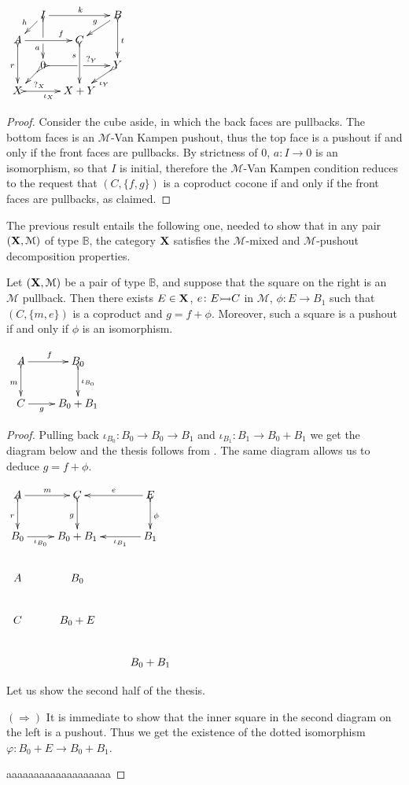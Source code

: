 \documentclass[a4paper,UKenglish,cleveref,pdftex, thm-restate,numberwithinsect,anonymous]{lipics}
\newcommand{\mto}[0]{\scalebox{1}{$\rightarrowtail$}}
\def\B{\textbf {\textup{B}}}
\def\C{\textbf {\textup{C}}}
\def\X{\textbf {\textup{X}}}
\begin{document}
\noindent 
\parbox{4cm}{$\xymatrix@C=10pt@R=10pt{&I\ar@{>->}[dd]|\hole_(.65){a}\ar[rr]^{k} \ar[dl]_{h} && B \ar@{>->}[dd]^{t} \ar[dl]_{g} \\ A  \ar@{>->}[dd]_{r}\ar[rr]^(.7){f} & & C \ar@{>->}[dd]_(.3){s}\\&0\ar@{>->}[rr]|\hole^(.65){?_Y} \ar@{>->}[dl]^{?_X} && Y \ar@{>->}[dl]^{\iota_Y} \\X \ar@{>->}[rr]_{\iota_X} & & X+Y}$}
 \parbox{10cm}{\begin{proof}
Consider the cube aside, in which the back faces are pullbacks. The bottom faces is an $\mathcal{M}$-Van Kampen pushout, thus the top face is a pushout if and only if the front faces are pullbacks. By strictness of $0$, $a\colon I\to 0$ is an isomorphism, so that $I$ is initial, therefore the $\mathcal{M}$-Van Kampen condition reduces to the request that $(C, \{f,g\})$ is a coproduct cocone if and only if the front faces are pullbacks, as claimed.
\end{proof}}

The previous result entails the following one, needed to show that  in any pair $(\X, \mathcal{M})$ of type $\mathbb{B}$, the category $\X$ satisfies the $\mathcal{M}$-mixed and $\mathcal{M}$-pushout decomposition properties.

\noindent
\parbox{10.7cm}{\begin{proposition}\label{prop:po2}
		Let $(\X, \mathcal{M})$ be a pair of type $\mathbb{B}$, and suppose that the square on the right is an $\mathcal{M}$ pullback. Then there exists $E\in \X$, $e\colon E\mto C$ in $\mathcal{M}$, $\phi:E\to B_1$ such that $(C, \{m, e\})$ is a coproduct and $g=f+\phi$. Moreover, such a square is a pushout if and only if $\phi$ is an isomorphism.
\end{proposition}} \parbox{3cm}{\vspace{-.2cm}$\xymatrix{A  \ar[r]^{f} \ar@{>->}[d]_{m}& B_0 \ar@{>->}[d]^{\iota_{B_{0}}}\\ C\ar[r]_-{g} & B_0+B_1}$}
\iffalse 
\begin{proof}
		Pulling back $\iota_{B_0}\colon B_0\to B_0\to B_1$ and $\iota_{B_1}\colon B_1\to B_0 + B_1$ we get the diagram below and the thesis follows from . The same diagram allows us to deduce $g=f+\phi$.	
	\parbox{5.2cm}{$\xymatrix{A\ar[r]^-{m} \ar@{>->}[d]_{r}& C  \ar@{>->}[d]_{g}& E \ar@{>->}[d]^{\phi}\ar[l]_-{e}\\B_0  \ar[r]_-{\iota_{B_0}}& B_0+B_1 & B_1 \ar[l]^-{\iota_{B_1}} \\ A & B_0 \\C & B_0+E\\ &&B_0+B_1}$}\parbox{8.8cm}{\vspace{-4.1cm}Let us show the second half of the thesis.
	
	$(\Rightarrow)$ It is immediate to show that the inner square in the second diagram on the left is a pushout. Thus we get the existence of the dotted isomorphism $\varphi\colon B_0+E\to B_0+B_1$.}
		
		\parbox{5cm}{aaaaaaaaaaaaaaaaaaa}
\end{proof}	
\end{document}
